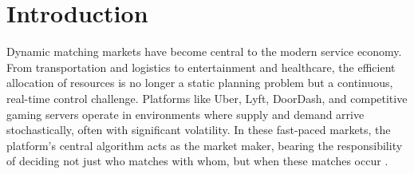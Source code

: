 \section{Introduction}
\label{sec:intro}
%
%

Dynamic matching markets have become central to the modern service economy.
From transportation and logistics to entertainment and healthcare, the efficient allocation of resources is no longer a static planning problem but a continuous, real-time control challenge.
Platforms like Uber, Lyft, DoorDash, and competitive gaming servers operate in environments where supply and demand arrive stochastically, often with significant volatility.
In these fast-paced markets, the platform's central algorithm acts as the market maker, bearing the responsibility of deciding not just who matches with whom, but when these matches occur \citep{uber2023}.


